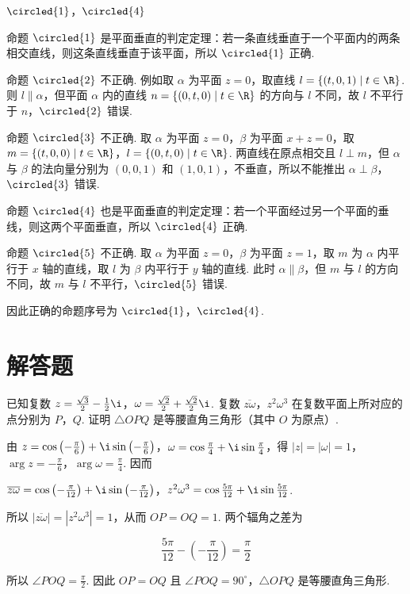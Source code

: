 \begin{answer}
\(\circled{1}\)，\(\circled{4}\)
\end{answer}

\begin{solution}
命题 \(\circled{1}\) 是平面垂直的判定定理：若一条直线垂直于一个平面内的两条相交直线，则这条直线垂直于该平面，所以 \(\circled{1}\) 正确.

命题 \(\circled{2}\) 不正确. 例如取 \(\alpha\) 为平面 \(z=0\)，取直线 \(l=\{(t,0,1)\mid t\in\R\}\). 则 \(l\parallel\alpha\)，但平面 \(\alpha\) 内的直线 \(n=\{(0,t,0)\mid t\in\R\}\) 的方向与 \(l\) 不同，故 \(l\) 不平行于 \(n\)，\(\circled{2}\) 错误.

命题 \(\circled{3}\) 不正确. 取 \(\alpha\) 为平面 \(z=0\)，\(\beta\) 为平面 \(x+z=0\)，取 \(m=\{(t,0,0)\mid t\in\R\}\)，\(l=\{(0,t,0)\mid t\in\R\}\). 两直线在原点相交且 \(l\perp m\)，但 \(\alpha\) 与 \(\beta\) 的法向量分别为 \((0,0,1)\) 和 \((1,0,1)\)，不垂直，所以不能推出 \(\alpha\perp\beta\)，\(\circled{3}\) 错误.

命题 \(\circled{4}\) 也是平面垂直的判定定理：若一个平面经过另一个平面的垂线，则这两个平面垂直，所以 \(\circled{4}\) 正确.

命题 \(\circled{5}\) 不正确. 取 \(\alpha\) 为平面 \(z=0\)，\(\beta\) 为平面 \(z=1\)，取 \(m\) 为 \(\alpha\) 内平行于 \(x\) 轴的直线，取 \(l\) 为 \(\beta\) 内平行于 \(y\) 轴的直线. 此时 \(\alpha\parallel\beta\)，但 \(m\) 与 \(l\) 的方向不同，故 \(m\) 与 \(l\) 不平行，\(\circled{5}\) 错误.

因此正确的命题序号为 \(\circled{1}\)，\(\circled{4}\).
\end{solution}

\section{解答题}

\begin{problem}
已知复数 \(z = \frac{\sqrt{3}}{2} - \frac{1}{2}\i\)，\(\omega = \frac{\sqrt{2}}{2} + \frac{\sqrt{2}}{2}\i\). 复数 \(\overline{z\omega}\)，\(z^{2}\omega^{3}\) 在复数平面上所对应的点分别为 \(P\)，\(Q\). 证明 \(\triangle OPQ\) 是等腰直角三角形（其中 \(O\) 为原点）.
\end{problem}

\begin{solution}
由 \(z=\cos\left(-\frac{\pi}{6}\right)+\i\sin\left(-\frac{\pi}{6}\right)\)，\(\omega=\cos\frac{\pi}{4}+\i\sin\frac{\pi}{4}\)，得 \(|z|=|\omega|=1\)，\(\arg z=-\frac{\pi}{6}\)，\(\arg\omega=\frac{\pi}{4}\). 因而

\(\overline{z\omega}=\cos\left(-\frac{\pi}{12}\right)+\i\sin\left(-\frac{\pi}{12}\right)\)，\(z^{2}\omega^{3}=\cos\frac{5\pi}{12}+\i\sin\frac{5\pi}{12}\).

所以 \(|\overline{z\omega}|=|z^{2}\omega^{3}|=1\)，从而 \(OP=OQ=1\). 两个辐角之差为

\[
\frac{5\pi}{12}-\left(-\frac{\pi}{12}\right)=\frac{\pi}{2}
\]

所以 \(\angle POQ=\frac{\pi}{2}\). 因此 \(OP=OQ\) 且 \(\angle POQ=90^\circ\)，\(\triangle OPQ\) 是等腰直角三角形.
\end{solution}

